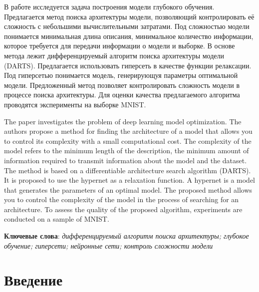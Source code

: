\documentclass[12pt, twoside]{article}
\begin{document}
\abstract
    {В работе исследуется задача построения модели глубокого обучения. Предлагается метод поиска архитектуры модели, позволяющий контролировать её сложность с небольшими вычислительными затратами. Под сложностью модели понимается минимальная длина описания,
минимальное количество информации, которое требуется для передачи информации о модели и выборке. В основе метода лежит дифференцируемый алгоритм поиска архитектуры модели (DARTS). Предлагается использовать гиперсеть в качестве функции релаксации.  Под гиперсетью понимается модель, генерирующуя параметры оптимальной модели. Предложенный метод позволяет контролировать сложность модели в процессе поиска архитектуры. Для оценки качества предлагаемого алгоритма проводятся эксперименты на выборке MNIST.


The paper investigates the problem of deep learning model optimization. The authors propose a method for finding the architecture of a model that allows you to control its complexity with a small computational cost. The complexity of the model refers to the minimum length of the description,
the minimum amount of information required to transmit information about the model and the dataset. The method is based on a differentiable architecture search algorithm (DARTS). It is proposed to use the hypernet as a relaxation function. A hypernet is a model that generates the parameters of an optimal model. The proposed method allows you to control the complexity of the model in the process of searching for an architecture. To assess the quality of the proposed algorithm, experiments are conducted on a sample of MNIST.
	
\bigskip
\noindent
\textbf{Ключевые слова}: \emph {дифференцируемый алгоритм поиска архитектуры; глубокое обучение; гиперсети; нейронные сети; контроль сложности модели}
}





\maketitle
\linenumbers

\section{Введение}
\end{document}

